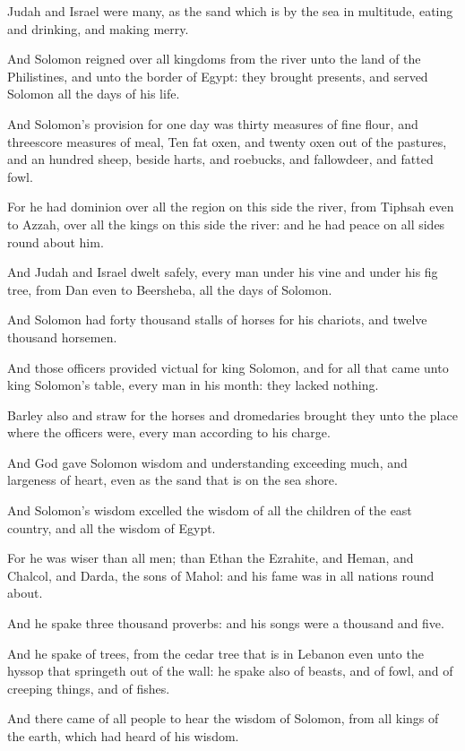 \verse Judah and Israel were many, as the sand which is by the sea in multitude, eating and drinking, and making merry.

\verse And Solomon reigned over all kingdoms from the river unto the land of the Philistines, and unto the border of Egypt: they brought presents, and served Solomon all the days of his life.

\verse And Solomon's provision for one day was thirty measures of fine flour, and threescore measures of meal, \verse Ten fat oxen, and twenty oxen out of the pastures, and an hundred sheep, beside harts, and roebucks, and fallowdeer, and fatted fowl.

\verse For he had dominion over all the region on this side the river, from Tiphsah even to Azzah, over all the kings on this side the river: and he had peace on all sides round about him.

\verse And Judah and Israel dwelt safely, every man under his vine and under his fig tree, from Dan even to Beersheba, all the days of Solomon.

\verse And Solomon had forty thousand stalls of horses for his chariots, and twelve thousand horsemen.

\verse And those officers provided victual for king Solomon, and for all that came unto king Solomon's table, every man in his month: they lacked nothing.

\verse Barley also and straw for the horses and dromedaries brought they unto the place where the officers were, every man according to his charge.

\verse And God gave Solomon wisdom and understanding exceeding much, and largeness of heart, even as the sand that is on the sea shore.

\verse And Solomon's wisdom excelled the wisdom of all the children of the east country, and all the wisdom of Egypt.

\verse For he was wiser than all men; than Ethan the Ezrahite, and Heman, and Chalcol, and Darda, the sons of Mahol: and his fame was in all nations round about.

\verse And he spake three thousand proverbs: and his songs were a thousand and five.

\verse And he spake of trees, from the cedar tree that is in Lebanon even unto the hyssop that springeth out of the wall: he spake also of beasts, and of fowl, and of creeping things, and of fishes.

\verse And there came of all people to hear the wisdom of Solomon, from all kings of the earth, which had heard of his wisdom.


